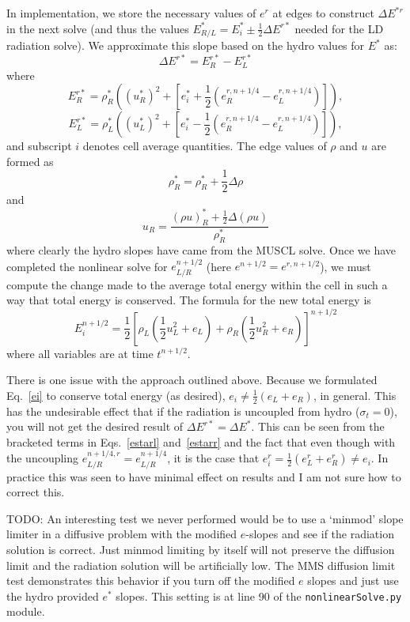 In implementation, we store the necessary values of $e^r$ at edges to construct
$\Delta E^{*r}$ in the next solve (and thus the values $E^*_{R/L} = E^*_i \pm \frac{1}{2}\Delta E^{r*}$
needed for the LD radiation solve).  We approximate this slope based on the hydro values
for $E^*$ as:
\begin{equation}
    \Delta E^{r*} = E^{r*}_R - E^{r*}_L
\end{equation}
where 
\begin{equation}\label{estarr}
    E^{r*}_R = \rho^*_R\left((u_R^*)^2 + \left[e^*_i +
\frac{1}{2}(e_R^{r,n+1/4}-e_L^{r,n+1/4})\right]\right),
\end{equation}
\begin{equation}\label{estarl}
    E^{r*}_L = \rho^*_L\left((u_L^*)^2 + \left[e^*_i -
    \frac{1}{2}(e_R^{r,n+1/4}-e_L^{r,n+1/4})\right]\right),
\end{equation}
and subscript $i$ denotes cell average quantities.  The edge values of $\rho$ and
$u$ are formed as
\begin{equation}
    \rho^*_R = \rho^*_R + \frac{1}{2} \Delta \rho
\end{equation}
and
\begin{equation}
    u_R = \frac{(\rho u)^*_R + \frac{1}{2} \Delta(\rho u)}{\rho^*_R}
\end{equation}
where clearly the hydro slopes have came from the MUSCL solve. Once we have completed
the nonlinear solve for $e^{n+1/2}_{L/R}$ (here $e^{n+1/2}=e^{r,n+1/2}$), we must compute the change made to the
average total energy within the cell in such a way that total energy is conserved. The formula for the new total energy is
\begin{equation}\label{ei}
    E^{n+1/2}_i = \frac{1}{2}\left[\rho_L\left(\frac{1}{2}u_L^2 + e_L\right)
    +\rho_R\left(\frac{1}{2}u_R^2 + e_R\right)\right]^{n+1/2}
\end{equation}
where all variables are at time $t^{n+1/2}$. 

There is one issue with the approach outlined above.  Because we formulated
Eq.~\eqref{ei} to conserve total energy (as desired), $e_i\neq
\frac{1}{2}(e_L +e_R)$, in general.  This has the undesirable effect that if the radiation is uncoupled from
hydro ($\sigma_t =0$), you will not get the desired result of $\Delta E^{r*} = \Delta
E^{*}$. This can be seen from the bracketed terms in Eqs.~\eqref{estarl}
and~\eqref{estarr} and the fact that even though with the uncoupling
$e_{L/R}^{n+1/4,r} = e_{L/R}^{n+1/4}$, it is the case that $e_i^{r} =
\frac{1}{2}(e_L^r+e_R^r) \neq e_i$. In practice this was seen to have minimal effect
on results and I am not sure how to correct this.

TODO: An interesting test we never performed would be to use a `minmod' slope limiter
in a diffusive problem with the modified $e$-slopes and see if the radiation solution is
correct.  Just minmod limiting by itself will not preserve the diffusion limit and
the radiation solution will be artificially low.  The MMS diffusion limit test
demonstrates this behavior if you turn off the modified $e$ slopes and just use the
hydro provided $e^*$ slopes. This setting is at line 90 of the
\verb{nonlinearSolve.py{
module.


